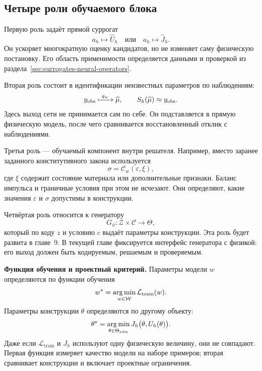 \subsection{Четыре роли обучаемого блока}
Первую роль задаёт прямой суррогат
\begin{equation}
 a_h\longmapsto \widehat U_h
 \quad\text{или}\quad
 a_h\longmapsto \widehat J_h.
\end{equation}
Он ускоряет многократную оценку кандидатов, но не изменяет саму физическую постановку. Его область применимости определяется данными и проверкой из раздела~\ref{sec:surrogates-neural-operators}.

Вторая роль состоит в идентификации неизвестных параметров по наблюдениям:
\begin{equation}
 y_{\mathrm{obs}}
 \xmapsto{\ q_w\ }
 \widehat\mu,
 \qquad
 S_h(\widehat\mu)\approx y_{\mathrm{obs}}.
\end{equation}
Здесь выход сети не принимается сам по себе. Он подставляется в прямую физическую модель, после чего сравнивается восстановленный отклик с наблюдениями.

Третья роль --- обучаемый компонент внутри решателя. Например, вместо заранее заданного конститутивного закона используется
\begin{equation}
 \sigma
 =
 \mathcal C_w(\varepsilon,\xi),
\end{equation}
где $\xi$ содержит состояние материала или дополнительные признаки. Баланс импульса и граничные условия при этом не исчезают. Они определяют, какие значения $\varepsilon$ и $\sigma$ допустимы в конструкции.

Четвёртая роль относится к генератору
\begin{equation}
 G_\phi: \mathcal Z\times\mathcal C\to\Theta,
\end{equation}
который по коду $z$ и условию $c$ выдаёт параметры конструкции. Эта роль будет развита в главе~9. В текущей главе фиксируется интерфейс генератора с физикой: его выход должен быть кодируемым, решаемым и проверяемым.

\medskip
\noindent\textbf{Функция обучения и проектный критерий.}
Параметры модели $w$ определяются по функции обучения
\begin{equation}
 w^\star
 =
 \operatorname*{arg\,min}_{w\in\mathcal W}
 \mathcal L_{\mathrm{train}}(w).
\end{equation}
Параметры конструкции $\theta$ определяются по другому объекту:
\begin{equation}
 \theta^\star
 =
 \operatorname*{arg\,min}_{\theta\in\Theta_{\mathrm{adm}}}
 J_h\bigl(\theta,U_h(\theta)\bigr).
\end{equation}
Даже если $\mathcal L_{\mathrm{train}}$ и $J_h$ используют одну физическую величину, они не совпадают. Первая функция измеряет качество модели на наборе примеров; вторая сравнивает конструкции и включает проектные ограничения.

